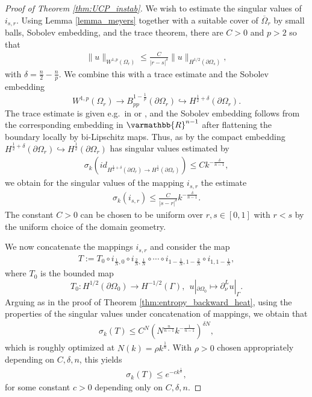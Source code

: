 \documentclass[12pt,twoside]{amsart}
\numberwithin{equation}{section}
\renewcommand{\leq}{\leqslant}
\renewcommand{\mathbb}{\varmathbb}
\newcommand {\p} {\partial}
\newcommand{\mR}{\mathbb{R}}                    %
\newcommand{\ol}[1]{\overline{#1}}
\begin{document}
\begin{proof}[Proof of Theorem \ref{thm:UCP_instab}]
We wish to estimate the singular values of $i_{s,r}$. Using Lemma \ref{lemma_meyers} together with a suitable cover of $\ol{\Omega}_r$ by small balls, Sobolev embedding, and the trace theorem, there are $C > 0$ and $p > 2$ so that 
  \begin{align*}
\|u\|_{W^{1,p}(\Omega_r)} \leq \frac{C}{|r-s|^{\delta}} \|u\|_{H^{1/2}(\p \Omega_s)},
\end{align*}
with $\delta= \frac{n}{2}-\frac{n}{p}$. We combine this with a trace estimate and the Sobolev embedding
  \[ W^{1,p}(\Omega_r) \to B^{1-\frac1p}_{pp}(\partial \Omega_r) \hookrightarrow
  H^{\frac{1}{2}+\delta} (\partial \Omega_r). \]
The trace estimate is given e.g.\ in \cite[Theorem 3.1]{JerisonKenig} or \cite[Chapter VI]{Stein},
and the Sobolev embedding follows from the corresponding embedding in $\mR^{n-1}$ after flattening the boundary locally by bi-Lipschitz maps. 
Thus, as by \cite[Theorem 20.6]{Triebel_fractals} the compact embedding $H^{\frac{1}{2}+\delta} (\partial \Omega_r) \hookrightarrow H^{\frac{1}{2}}(\partial \Omega_r)$ has singular values estimated by
\begin{align*}
\sigma_k(id_{H^{\frac{1}{2}+\delta}(\partial \Omega_r) \rightarrow H^{\frac{1}{2}}(\partial \Omega_r)}) \leq C k^{-\frac{\delta}{n-1}},
\end{align*}
we obtain for the singular values of the mapping $i_{s,r}$ the estimate
\begin{align*}
\sigma_k(i_{s,r}) \leq \frac{C}{|s-r|^{\delta}} k^{-\frac{\delta}{n-1}}.
\end{align*}
The constant $C>0$ can be chosen to be uniform over $r, s \in [0,1]$ with $r < s$ by the uniform choice of the domain geometry.

We now concatenate the mappings $i_{s,r}$ and consider the map
\begin{align*}
T:= T_0 \circ i_{\frac{1}{N}, 0}\circ i_{\frac{2}{N},\frac{1}{N}} \circ \cdots \circ i_{1-\frac{1}{N}, 1- \frac{2}{N}} \circ i_{1,1-\frac{1}{N}},
\end{align*}
where $T_0$ is the bounded map 
\[
T_0: H^{1/2}(\p \Omega_0) \to H^{-1/2}(\Gamma), \ \ u|_{\p \Omega_0} \mapsto \p_{\nu}^L u|_{\Gamma}.
\]
Arguing as in the proof of Theorem \ref{thm:entropy_backward_heat}, using the properties of the singular values under concatenation of mappings, we obtain that
\begin{align} \label{sigmakt_estimate}
\sigma_k(T) \leq C^N \left(N^{\frac{n}{n-1}} k^{-\frac{1}{n-1}} \right)^{\delta N},
\end{align}
which is roughly optimized at $N(k) = \rho k^{\frac{1}{n}}$. With $\rho>0$ chosen appropriately depending on $C, \delta, n$, this yields
\begin{align*}
\sigma_k(T) \leq e^{-c k^{\frac{1}{n}}},
\end{align*}
for some constant $c > 0$ depending only on $C, \delta, n$.


\end{proof}
\end{document}
